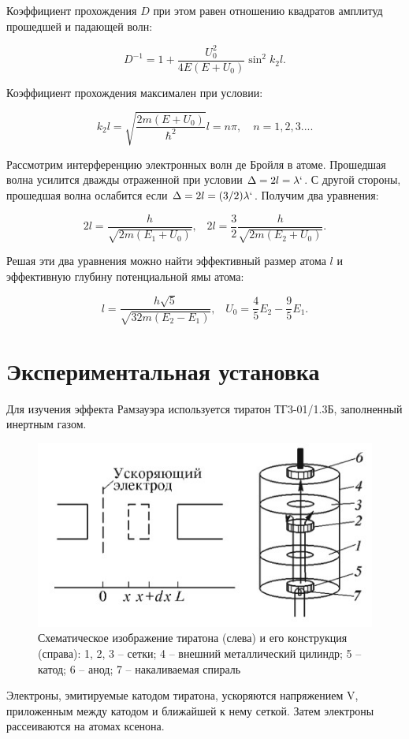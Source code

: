 \documentclass[14pt, a4paper]{report}
\begin{document}
Коэффициент прохождения $D$ при этом равен отношению квадратов амплитуд прошедшей и падающей волн:

\[D^{-1}=1+\frac{U_0^2}{4E(E+U_0)}\sin^2{k_2l}\text{.}\]

Коэффициент прохождения максимален при условии:

\[k_2l=\sqrt{\frac{2m(E + U_0)}{\hbar^2}}l=n\pi,\quad n=1,2,3...\text{.}\]

Рассмотрим интерференцию электронных волн де Бройля в атоме. Прошедшая волна усилится дважды отраженной при условии $\Delta=2l=\lambda`$. С другой стороны, прошедшая волна ослабится если $\Delta=2l=(3/2)\lambda`$. Получим два уравнения:

\[2l=\frac{h}{\sqrt{2m(E_1+U_0)}}\text{,}\quad 2l=\frac{3}{2}\frac{h}{\sqrt{2m(E_2+U_0)}}\text{.}\]

Решая эти два уравнения можно найти эффективный размер атома $l$ и эффективную глубину потенциальной ямы атома:

\[l=\frac{h\sqrt{5}}{\sqrt{32m(E_2-E_1)}}\text{,}\quad U_0=\frac{4}{5}E_2-\frac{9}{5}E_1\text{.}\]

\section{Экспериментальная установка}

Для изучения эффекта Рамзауэра используется тиратон ТГ3-01/1.3Б, заполненный инертным газом.

\begin{figure}[H]
\centering
\includegraphics[scale=0.8]{../images/513-3}
\caption{Схематическое изображение тиратона (слева) и его конструкция (справа): 1, 2, 3 -- сетки; 4 -- внешний металлический цилиндр; 5 -- катод; 6 -- анод; 7 -- накаливаемая спираль}
\end{figure}

Электроны, эмитируемые катодом тиратона, ускоряются напряжением V, приложенным между катодом и ближайшей к нему сеткой. Затем электроны рассеиваются на атомах ксенона.
\end{document}
